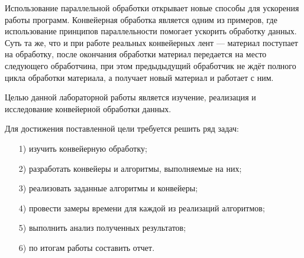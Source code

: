 

Использование параллельной обработки открывает новые способы для
ускорения работы программ. Конвейерная обработка является одним из примеров, где использование принципов параллельности помогает ускорить обработку данных. Суть та же, что и при работе реальных конвейерных лент ---
материал поступает на обработку, после окончания обработки материал передается на место следующего обработчина, при этом предыдыдущий
обработчик не ждёт полного цикла обработки материала, а получает новый
материал и работает с ним.

Целью данной лабораторной работы является изучение, реализация и исследование конвейерной обработки данных.

Для достижения поставленной цели требуется решить ряд задач:
\begin{enumerate}
	\item[1)] изучить конвейерную обработку;
	\item[2)] разработать конвейеры и алгоритмы, выполняемые на них;
	\item[3)] реализовать заданные алгоритмы и конвейеры;
	\item[4)] провести замеры времени для каждой из реализаций алгоритмов;
 	\item[5)] выполнить анализ полученных результатов;
	\item[6)] по итогам работы составить отчет.
\end{enumerate}

\newpage
